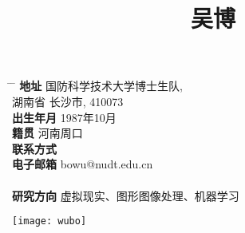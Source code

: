 \documentclass[20pt]{article} %
\begin{document}

\title{吴博} %
\begin{minipage}{0.5\textwidth}
\centering
\begin{tabbing}%
\hspace{3cm} \= \hspace{4cm} \= \kill %
{\bf 地址} \> 国防科学技术大学博士生队,\\%
\> 湖南省 长沙市, 410073 \\%
{\bf 出生年月} \> 1987年10月 \\ %
{\bf 籍贯} \> 河南周口 \\%
{\bf 联系方式}  \\ %
{\bf 电子邮箱} \> bowu@nudt.edu.cn \\ \\%
{\bf 研究方向} \> 虚拟现实、图形图像处理、机器学习 \\ %
\end{tabbing}%
\end{minipage}
\begin{minipage}{0.5\textwidth}
\hspace{3cm}
  \texttt{[image: wubo]}\\
\end{minipage}
\end{document}
